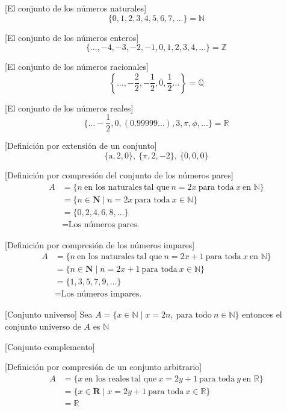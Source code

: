 	[El conjunto de los números naturales]
	\[ \{0,1,2,3,4,5,6,7,\ldots\} = \mathbb{N} \]
	
	[El conjunto de los números enteros] 
	\[ {\{\ldots,-4,-3,-2,-1,0,1,2,3,4,\ldots\} = \mathbb{Z}} \]
	
	[El conjunto de los números racionales] 
	\[
		\left\{\ldots,-\frac{2}{2},-\frac{1}{2},0,\frac{1}{2}\ldots \right\} = \mathbb{Q}
	\]

	[El conjunto de los números reales] 
	\[
		\{\ldots-\frac{1}{2},0,(0.99999\ldots),3,\pi,\phi,\ldots\} = \mathbb{R}
	\]

	[Definición por extensión de un conjunto] 
	\[
		\{\text{a}, 2, 0\},\ \{\pi, 2, -2\},\ \{0, 0, 0\}
	\]


	[Definición por compresión del conjunto de los números pares]
	\begin{align}
		A 
		&= \{n\ \text{en los naturales}\  \text{tal que}\ n=2x\ \text{para toda}\ x\ \text{en } \mathbb{N} \}\\
		&= \{n \in \textbf{N}  \mid n=2x\ \text{para toda}\ x\in \mathbb{N} \}\\
		&= \{0,2,4,6,8,\ldots\} \\
		&= \text{Los números pares.}
	\end{align}

	[Definición por compresión de los números impares]
	\begin{align}
		A 
		&= \{n\ \text{en los naturales}\  \text{tal que}\ n=2x + 1\ \text{para toda}\ x\ \text{en } \mathbb{N} \}\\
		&= \{n \in \textbf{N}  \mid n=2x + 1\ \text{para toda}\ x\in \mathbb{N} \}\\
		&= \{1,3,5,7,9,\ldots\} \\
		&= \text{Los números impares.}
	\end{align}

	[Conjunto universo] Sea \(A = \{x \in \mathbb{N} \mid x=2n,\ \text{para todo}\ n\in\mathbb{N}\}\) 
	entonces el conjunto universo de \(A\) es \(\mathbb{N}\)

	[Conjunto complemento] 

	[Definición por compresión de un conjunto arbitrario]
	\begin{align}
		A 
		&= \{x\ \text{en los reales}\  \text{tal que}\ x=2y + 1\ \text{para toda}\ y\ \text{en } \mathbb{R} \}\\
		&= \{x \in \textbf{R}  \mid x=2y + 1\ \text{para toda}\ x\in \mathbb{R} \}\\
		&= \mathbb{R}
	\end{align}


